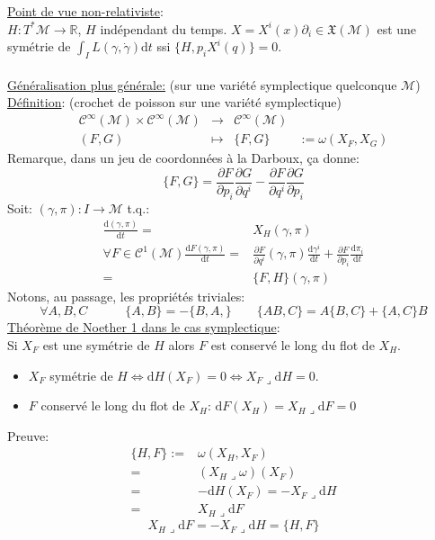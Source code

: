 \documentclass[a4paper,11pt]{article}
\renewcommand{\d}{{\mathrm{d}}}
\newcommand{\dr}[2]{\frac{\partial {#1}}{\partial{#2}}}
\begin{document}
\noindent \underline{Point de vue non-relativiste}:\\
$H:T^*\mathcal{M}\to \mathbb{R}$, $H$ indépendant du temps. $X=X^i(x)\partial_i \in \mathfrak{X}(\mathcal{M})$ est une symétrie de $\int_I L(\gamma,\dot\gamma)\d t$ ssi $\{H, p_i X^i(q)\}=0$.\\\\
\underline{Généralisation plus générale:} (sur une variété symplectique quelconque $\mathcal{M}$)\\
\underline{Définition}: (crochet de poisson sur une variété symplectique)\\
$$\begin{matrix}
\mathcal{C}^\infty(\mathcal{M})\times\mathcal{C}^\infty(\mathcal{M}) &
\to & \mathcal{C}^\infty(\mathcal{M})&\\
(F,G) & \mapsto & \{F,G\}&
:= \omega(X_F,X_G)
\end{matrix}$$
Remarque, dans un jeu de coordonnées à la Darboux, ça donne:
$$\{F,G\} = \dr F{p_i}\dr G{q^i} - \dr F{q^i}\dr G{p_i}$$
Soit: $(\gamma,\pi): I \to \mathcal{M}$ t.q.:
\begin{align*}
\frac{\d (\gamma,\pi)}{\d t} =& X_H(\gamma,\pi)\\
\forall F \in\mathcal{C}^1(\mathcal{M}) \frac{\d F(\gamma,\pi)}{\d t} =&
\dr F{q^i}(\gamma,\pi)\frac{\d \gamma^i}{\d t} + \dr F{p_i}\frac{\d \pi_i}{\d t}\\
=& \{F,H\}(\gamma,\pi)
\end{align*}
Notons, au passage, les propriétés triviales:
$$\forall A,B,C \quad \quad \quad \{A,B\}=-\{B,A,\} \quad \quad \{AB,C\}=A\{B,C\}+\{A,C\}B$$
\underline{Théorème de Noether 1 dans le cas symplectique}:\\
Si $X_F$ est une symétrie de $H$ alors $F$ est conservé le long du flot de $X_H$.
\begin{itemize}
\item $X_F$ symétrie de $H \iff \d H(X_F)=0 \iff X_F\lrcorner\d H = 0$.
\item $F$ conservé le long du flot de $X_H$: $\d F(X_H) = X_H\lrcorner\d F = 0$
\end{itemize}
Preuve:
\begin{align*}
\{H,F\} :=& \omega(X_H, X_F)\\
=& (X_H\lrcorner \omega)(X_F)\\
=& -\d H(X_F) = - X_F \lrcorner \d H\\
=& X_H \lrcorner \d F
\end{align*}
$$\boxed{X_H\lrcorner \d F = - X_F \lrcorner\d H =\{H,F\}}$$
\end{document}
